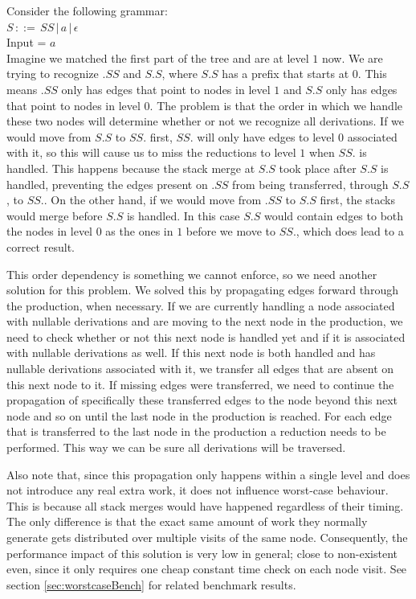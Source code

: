 \documentclass[a4paper,10pt]{article}
\begin{document}
Consider the following grammar:\\
$S\,::=\,SS\,|\,a\,|\,\epsilon$\\
Input = $a$\\
Imagine we matched the first part of the tree and are at level $1$ now. We are trying to recognize $.SS$ and $S.S$, where $S.S$ has a prefix that starts at $0$. This means $.SS$ only has edges that point to nodes in level $1$ and $S.S$ only has edges that point to nodes in level $0$. The problem is that the order in which we handle these two nodes will determine whether or not we recognize all derivations. If we would move from $S.S$ to $SS.$ first, $SS.$ will only have edges to level $0$ associated with it, so this will cause us to miss the reductions to level $1$ when $SS.$ is handled. This happens because the stack merge at $S.S$ took place after $S.S$ is handled, preventing the edges present on $.SS$ from being transferred, through $S.S$, to $SS.$. On the other hand, if we would move from $.SS$ to $S.S$ first, the stacks would merge before $S.S$ is handled. In this case $S.S$ would contain edges to both the nodes in level $0$ as the ones in $1$ before we move to $SS.$, which does lead to a correct result.

This order dependency is something we cannot enforce, so we need another solution for this problem. We solved this by propagating edges forward through the production, when necessary. If we are currently handling a node associated with nullable derivations and are moving to the next node in the production, we need to check whether or not this next node is handled yet and if it is associated with nullable derivations as well. If this next node is both handled and has nullable derivations associated with it, we transfer all edges that are absent on this next node to it. If missing edges were transferred, we need to continue the propagation of specifically these transferred edges to the node beyond this next node and so on until the last node in the production is reached. For each edge that is transferred to the last node in the production a reduction needs to be performed. This way we can be sure all derivations will be traversed.

Also note that, since this propagation only happens within a single level and does not introduce any real extra work, it does not influence worst-case behaviour. This is because all stack merges would have happened regardless of their timing. The only difference is that the exact same amount of work they normally generate gets distributed over multiple visits of the same node. Consequently, the performance impact of this solution is very low in general; close to non-existent even, since it only requires one cheap constant time check on each node visit. See section \ref{sec:worstcaseBench} for related benchmark results.
\end{document}

